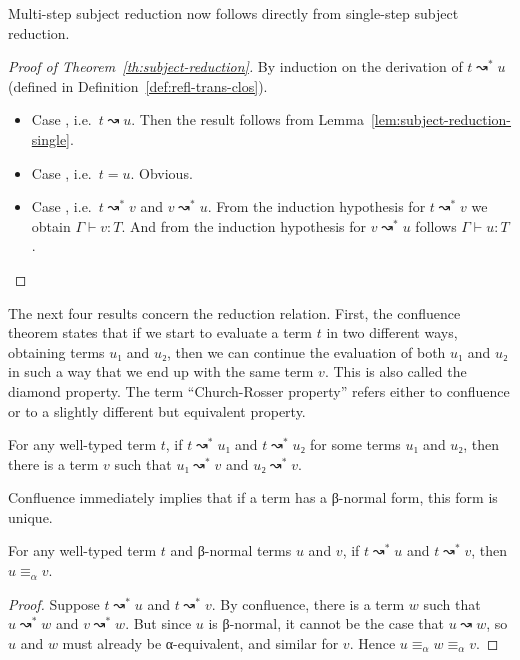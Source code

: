 \documentclass{scrartcl}
\theoremstyle{definition}
\newcommand{\lbl}[1]{\RightTirNameStyle{#1}}
\begin{document}
Multi-step subject reduction now follows directly from single-step subject reduction.

\begin{proof}[Proof of Theorem~\ref{th:subject-reduction}]
  By induction on the derivation of $t ↝^{*} u$ (defined in Definition~\ref{def:refl-trans-clos}).
  \begin{itemize}
    \item Case \lbl{Step}, i.e.\ $t ↝ u$.
          Then the result follows from Lemma~\ref{lem:subject-reduction-single}.
    \item Case \lbl{Refl}, i.e.\ $t = u$.
          Obvious.
    \item Case \lbl{Trans}, i.e.\ $t ↝^{*} v$ and $v ↝^{*} u$.
          From the induction hypothesis for $t ↝^{*} v$ we obtain $Γ ⊢ v : T$.
          And from the induction hypothesis for $v ↝^{*} u$ follows $Γ ⊢ u : T$.
  \end{itemize}
\end{proof}

The next four results concern the reduction relation.
First, the confluence theorem states that if we start to evaluate a term $t$ in two different ways, obtaining terms $u₁$ and $u₂$, then we can continue the evaluation of both $u₁$ and $u₂$ in such a way that we end up with the same term $v$.
This is also called the diamond property.
The term \enquote{Church-Rosser property} refers either to confluence or to a slightly different but equivalent property.

\begin{theorem}\label{th:confluence}
  For any well-typed term $t$, if $t ↝^{*} u₁$ and $t ↝^{*} u₂$ for some terms $u₁$ and $u₂$, then there is a term $v$ such that $u₁ ↝^{*} v$ and $u₂ ↝^{*} v$.
\end{theorem}

Confluence immediately implies that if a term has a β-normal form, this form is unique.

\begin{corollary}\label{th:nf-unique}
  For any well-typed term $t$ and β-normal terms $u$ and $v$, if $t ↝^{*} u$ and $t ↝^{*} v$, then $u ≡_{α} v$.
\end{corollary}

\begin{proof}
  Suppose $t ↝^{*} u$ and $t ↝^{*} v$.
  By confluence, there is a term $w$ such that $u ↝^{*} w$ and $v ↝^{*} w$.
  But since $u$ is β-normal, it cannot be the case that $u ↝ w$, so $u$ and $w$ must already be α-equivalent, and similar for $v$.
  Hence $u ≡_{α} w ≡_{α} v$.
\end{proof}
\end{document}

